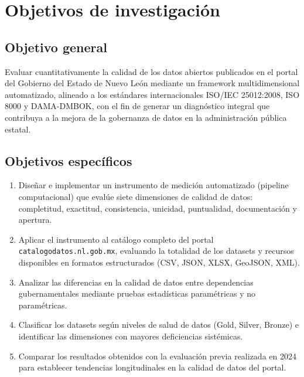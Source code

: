 \documentclass[12pt,letterpaper]{article}
\begin{document}
\section{Objetivos de investigación}

\subsection{Objetivo general}

Evaluar cuantitativamente la calidad de los datos abiertos publicados en el portal del Gobierno del Estado de Nuevo León mediante un framework multidimensional automatizado, alineado a los estándares internacionales ISO/IEC 25012:2008, ISO 8000 y DAMA-DMBOK, con el fin de generar un diagnóstico integral que contribuya a la mejora de la gobernanza de datos en la administración pública estatal.

\subsection{Objetivos específicos}

\begin{enumerate}
  \item Diseñar e implementar un instrumento de medición automatizado (pipeline computacional) que evalúe siete dimensiones de calidad de datos: completitud, exactitud, consistencia, unicidad, puntualidad, documentación y apertura.

  \item Aplicar el instrumento al catálogo completo del portal \texttt{catalogodatos.nl.gob.mx}, evaluando la totalidad de los datasets y recursos disponibles en formatos estructurados (CSV, JSON, XLSX, GeoJSON, XML).

  \item Analizar las diferencias en la calidad de datos entre dependencias gubernamentales mediante pruebas estadísticas paramétricas y no paramétricas.

  \item Clasificar los datasets según niveles de salud de datos (Gold, Silver, Bronze) e identificar las dimensiones con mayores deficiencias sistémicas.

  \item Comparar los resultados obtenidos con la evaluación previa realizada en 2024 para establecer tendencias longitudinales en la calidad de datos del portal.
\end{enumerate}
\end{document}
